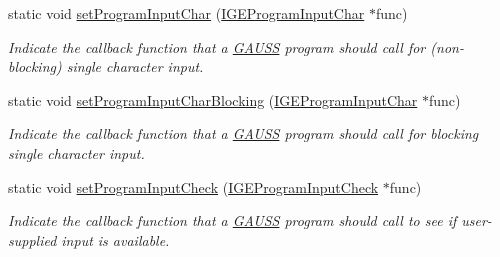 \begin{DoxyCompactItemize}
static void \hyperlink{class_g_a_u_s_s_a71a60afb143ae00b18d6fe3fd99f316d}{set\-Program\-Input\-Char} (\hyperlink{class_i_g_e_program_input_char}{I\-G\-E\-Program\-Input\-Char} $\ast$func)
\begin{DoxyCompactList}\small\item\em Indicate the callback function that a \hyperlink{class_g_a_u_s_s}{G\-A\-U\-S\-S} program should call for (non-\/blocking) single character input. \end{DoxyCompactList}\item 
static void \hyperlink{class_g_a_u_s_s_a300d6e33dbfd2a45f56ff2769f585435}{set\-Program\-Input\-Char\-Blocking} (\hyperlink{class_i_g_e_program_input_char}{I\-G\-E\-Program\-Input\-Char} $\ast$func)
\begin{DoxyCompactList}\small\item\em Indicate the callback function that a \hyperlink{class_g_a_u_s_s}{G\-A\-U\-S\-S} program should call for blocking single character input. \end{DoxyCompactList}\item 
static void \hyperlink{class_g_a_u_s_s_a6517b404cf71d157808a1cb73e3c0ddb}{set\-Program\-Input\-Check} (\hyperlink{class_i_g_e_program_input_check}{I\-G\-E\-Program\-Input\-Check} $\ast$func)
\begin{DoxyCompactList}\small\item\em Indicate the callback function that a \hyperlink{class_g_a_u_s_s}{G\-A\-U\-S\-S} program should call to see if user-\/supplied input is available. \end{DoxyCompactList}\end{DoxyCompactItemize}

